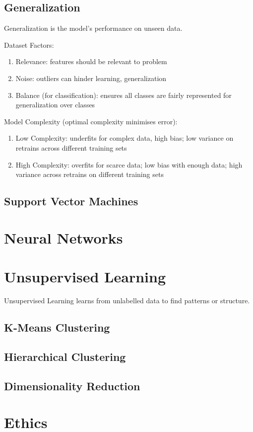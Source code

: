 \documentclass[12pt, a4paper]{article}
\begin{document}
\begin{multicols*}{3}
\subsection{Generalization}
Generalization is the model's performance on unseen data.

Dataset Factors:
\begin{enumerate}[\roman*.]
  \item Relevance: features should be relevant to problem
  \item Noise: outliers can hinder learning, generalization 
  \item Balance (for classification): ensures all classes are fairly represented for generalization over classes
\end{enumerate}

Model Complexity (optimal complexity minimises error):
\begin{enumerate}[\roman*.]
  \item Low Complexity: underfits for complex data, high bias; low variance on retrains across different training sets 
  \item High Complexity: overfits for scarce data; low bias with enough data; high variance across retrains on different training sets 
\end{enumerate}
\vspace{-1em}
\colbreak
\subsection{Support Vector Machines}
\section{Neural Networks}
\section{Unsupervised Learning}
Unsupervised Learning learns from unlabelled data to find patterns or structure.
\subsection{K-Means Clustering}
\subsection{Hierarchical Clustering}
\subsection{Dimensionality Reduction}
\section{Ethics}
\colbreak
{}
\end{multicols*}
\end{document}
